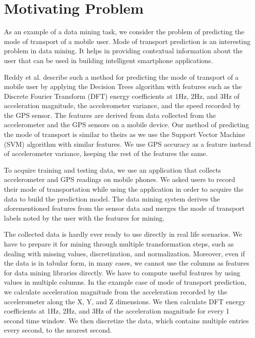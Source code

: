 \section{Motivating Problem}

As an example of a data mining task, we consider the problem of predicting the mode of transport of a mobile user. Mode of transport prediction is an interesting problem in data mining. It helps in providing contextual information about the user that can be used in building intelligent smartphone applications.

Reddy et al. \cite{MTP} describe such a method for predicting the mode of transport of a mobile user by applying the Decision Trees algorithm with features such as the Discrete Fourier Transform (DFT) energy coefficients at 1Hz, 2Hz, and 3Hz of acceleration magnitude, the accelerometer variance, and the speed recorded by the GPS sensor. The features are derived from data collected from the accelerometer and the GPS sensors on a mobile device. Our method of predicting the mode of transport is similar to theirs as we use the Support Vector Machine (SVM) algorithm with similar features. We use GPS accuracy as a feature instead of accelerometer variance, keeping the rest of the features the same.

To acquire training and testing data, we use an application that collects accelerometer and GPS readings on mobile phones. We asked users to record their mode of transportation while using the application in order to acquire the data to build the prediction model. The data mining system derives the aforementioned features from the sensor data and merges the mode of transport labels noted by the user with the features for mining.

The collected data is hardly ever ready to use directly in real life scenarios. We have to prepare it for mining through multiple transformation steps, such as dealing with missing values, discretization, and normalization. Moreover, even if the data is in tabular form, in many cases, we cannot use the columns as features for data mining libraries directly. We have to compute useful features by using values in multiple columns. In the example case of mode of transport prediction, we calculate acceleration magnitude from the acceleration recorded by the accelerometer along the X, Y, and Z dimensions. We then calculate DFT energy coefficients at 1Hz, 2Hz, and 3Hz of the acceleration magnitude for every 1 second time window. We then discretize the data, which contains multiple entries every second, to the nearest second. 

